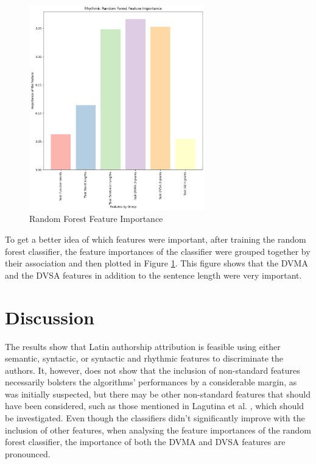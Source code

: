 \documentclass{csfourzero}
\begin{document}
\begin{figure}[hbt!]
    \centering
    \includegraphics[width=3in]{Rhythmic Random Forest Feature Importance.png}
    \caption{Random Forest Feature Importance}
    \label{fig:RandomForest}
\end{figure}
\newline 
To get a better idea of which features were important, after training the random forest classifier, the feature importances of the classifier were grouped together by their association and then plotted in Figure \ref{fig:RandomForest}. This figure shows that the DVMA and the DVSA features in addition to the sentence length were very important.
\section{Discussion}
\label{sec:discuss}

The results show that Latin authorship attribution is feasible using either semantic, syntactic, or syntactic and rhythmic features to discriminate the authors. It, however, does not show that the inclusion of non-standard features necessarily bolsters the algorithms' performances by a considerable margin, as was initially suspected, but there may be other non-standard features that should have been considered, such as those mentioned in Lagutina et al. \cite{lagutina2020automatic}, which should be investigated. Even though the classifiers didn't significantly improve with the inclusion of other features, when analysing the feature importances of the random forest classifier, the importance of both the DVMA and DVSA features are pronounced. 
\end{document}
